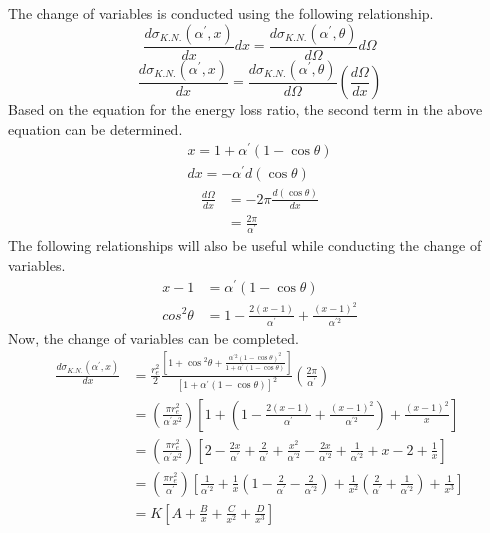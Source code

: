The change of variables is conducted using the following relationship.
\begin{equation*}
  \frac{d\sigma_{K.N.}(\alpha^{'},x)}{dx} dx = 
  \frac{d\sigma_{K.N.}(\alpha^{'},\theta)}{d\Omega} d\Omega
\end{equation*}
\begin{equation*}
  \frac{d\sigma_{K.N.}(\alpha^{'},x)}{dx} = 
  \frac{d\sigma_{K.N.}(\alpha^{'},\theta)}{d\Omega}
  \left(\frac{d\Omega}{dx}\right)
\end{equation*}
Based on the equation for the energy loss ratio, the second term in the above
equation can be determined.
\begin{align}
  x = 1 + \alpha^{'}(1-\cos{\theta}) \nonumber \\
  dx = -\alpha^{'} d(\cos{\theta}) \nonumber
\end{align}
\begin{align}
  \frac{d\Omega}{dx} & = -2\pi\frac{d(\cos{\theta})}{dx} \nonumber \\
  & = \frac{2\pi}{\alpha^{'}}
\end{align}
The following relationships will also be useful while conducting the change
of variables.
\begin{align}
  x - 1 & = \alpha^{'}(1-\cos{\theta}) \\
  cos^2\theta & = 1 - \frac{2(x-1)}{\alpha^{'}} + \frac{(x-1)^2}{\alpha^{'2}}
\end{align}
Now, the change of variables can be completed.
\begin{align}
  \frac{d\sigma_{K.N.}(\alpha^{'},x)}{dx} & = \frac{r_e^2}{2}
  \frac{\left[1 + \cos{^{2}\theta} + \frac{\alpha^{'2}(1-\cos{\theta})^2}
                                  {1 + \alpha^{'}(1-\cos{\theta})}\right] }
  {\left[1 + \alpha^{'}(1-\cos{\theta}) \right]^2} 
  \left(\frac{2\pi}{\alpha^{'}}\right) \nonumber \\
  & = \left(\frac{\pi r_e^2}{\alpha^{'}x^2}\right)
  \left[1 + 
    \left(1 - \frac{2(x-1)}{\alpha^{'}} + \frac{(x-1)^2}{\alpha^{'2}}\right) +
    \frac{(x-1)^2}{x} \right] \nonumber \\
  & = \left(\frac{\pi r_e^2}{\alpha^{'}x^2}\right) \left[2 - 
    \frac{2x}{\alpha^{'}} + \frac{2}{\alpha^{'}} +\frac{x^2}{\alpha^{'2}} -
    \frac{2x}{\alpha^{'2}} + \frac{1}{\alpha^{'2}} + x - 2 + \frac{1}{x} \right]
  \nonumber \\
  & = \left(\frac{\pi r_e^2}{\alpha^{'}}\right) \left[ \frac{1}{\alpha^{'2}} +
    \frac{1}{x}\left(1 - \frac{2}{\alpha^{'}}-\frac{2}{\alpha^{'2}}\right) +
    \frac{1}{x^2}\left(\frac{2}{\alpha^{'}} + \frac{1}{\alpha^{'2}}\right) +
    \frac{1}{x^3} \right] \nonumber \\
  & = K \left[A + \frac{B}{x} + \frac{C}{x^2} + \frac{D}{x^3}\right]
\end{align}
